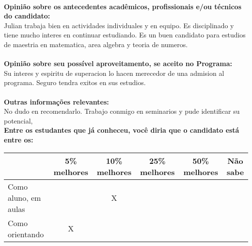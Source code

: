 \documentclass[11pt]{article}
\begin{document}
\\
\textbf{Opinião sobre os antecedentes acadêmicos, profissionais e/ou técnicos do candidato:}
\\Julian trabaja bien en actividades individuales y en equipo. Es disciplinado y tiene mucho interes en continuar estudiando. Es un buen candidato para estudios de maestria en matematica, area algebra y teoria de numeros.\\
\\
\textbf{Opinião sobre seu possível aproveitamento, se aceito no Programa:}
\\Su interes y espiritu de superacion lo hacen merecedor de una admision al programa. Seguro tendra exitos en sus estudios.\\ 
\\
\textbf{Outras informações relevantes:} \\No dudo en recomendarlo. Trabajo conmigo en seminarios y pude identificar su potencial,
\\[0.3cm]
\textbf{Entre os estudantes que já conheceu, você diria que o candidato está entre os:}
\\
\begin{tabular}{|l|c|c|c|c|c|}
\hline
 & 5\% melhores & 10\% melhores & 25\% melhores & 50\% melhores & Não sabe \\
\hline
Como aluno, em aulas &  & X &  &  & \\
\hline
Como orientando & X &  &  &  & \\
\hline
\end{tabular}
\end{document}
